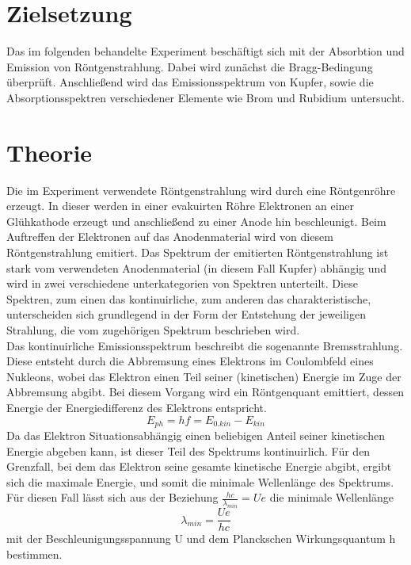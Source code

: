 \section{Zielsetzung}
\label{sec:zielsetzung}
Das im folgenden behandelte Experiment beschäftigt sich mit der Absorbtion und Emission von Röntgenstrahlung. Dabei wird zunächst die Bragg-Bedingung 
überprüft. Anschließend wird das Emissionsspektrum von Kupfer, sowie die Absorptionsspektren verschiedener Elemente wie Brom und Rubidium untersucht.
\section{Theorie}
\label{sec:theorie}
Die im Experiment verwendete Röntgenstrahlung wird durch eine Röntgenröhre erzeugt. In dieser werden in einer evakuirten Röhre Elektronen an einer Glühkathode erzeugt und anschließend zu einer Anode hin beschleunigt. Beim Auftreffen der Elektronen auf das Anodenmaterial wird von diesem Röntgenstrahlung emitiert.
Das Spektrum der emitierten Röntgenstrahlung ist stark vom verwendeten Anodenmaterial (in diesem Fall Kupfer) abhängig und wird in zwei verschiedene unterkategorien von Spektren unterteilt. Diese Spektren, zum einen das kontinuirliche, zum anderen das charakteristische, unterscheiden sich grundlegend in der Form der Entstehung der jeweiligen Strahlung, die vom zugehörigen Spektrum beschrieben wird. \\
Das kontinuirliche Emissionsspektrum beschreibt die sogenannte Bremsstrahlung. Diese entsteht durch die Abbremsung eines Elektrons im Coulombfeld eines Nukleons, wobei das Elektron einen Teil seiner (kinetischen) Energie im Zuge der Abbremsung abgibt. Bei diesem Vorgang wird ein Röntgenquant emittiert, dessen Energie der Energiedifferenz des Elektrons entspricht.
\begin{equation}
E_{ph}=hf=E_{0.kin}-E_{kin}
\end{equation}
Da das Elektron Situationsabhängig einen beliebigen Anteil seiner kinetischen Energie abgeben kann, ist dieser Teil des Spektrums kontinuirlich. Für den Grenzfall, bei dem das Elektron seine gesamte kinetische Energie abgibt, ergibt sich die maximale Energie, und somit die minimale Wellenlänge des Spektrums. Für diesen Fall lässt sich aus der Beziehung $\frac{hc}{\lambda_{min}}=Ue$ die minimale Wellenlänge
\begin{equation}
\lambda_{min}=\frac{Ue}{hc}
\end{equation}
mit der Beschleunigungsspannung U und dem Planckschen Wirkungsquantum h bestimmen. \\

